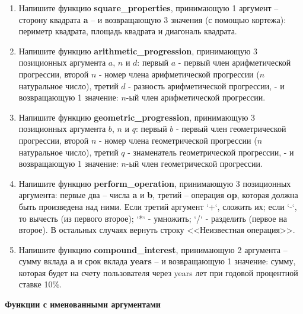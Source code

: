 \documentclass[a4,12pt]{article}
\theoremstyle{remark}
\begin{document}
\begin{enumerate}
    \item Напишите функцию \textbf{square\_properties}, принимающую 1 аргумент – сторону квадрата \textbf{a} – и возвращающую 3 значения (с помощью кортежа): периметр квадрата, площадь квадрата и диагональ квадрата.
    \item Напишите функцию \textbf{arithmetic\_progression}, принимающую 3 позиционных аргумента $a$, $n$ и $d$: первый $a$ - первый член арифметической прогрессии, второй $n$ - номер члена арифметической прогрессии ($n$ натуральное число), третий $d$ - разность арифметической прогрессии, - и возвращающую 1 значение: $n$-ый член арифметической прогрессии.
    \item Напишите функцию \textbf{geometric\_progression}, принимающую 3 позиционных аргумента $b$, $n$ и $q$: первый $b$ - первый член геометрической прогрессии, второй $n$ - номер члена геометрической прогрессии ($n$ натуральное число), третий $q$ - знаменатель геометрической прогрессии, - и возвращающую 1 значение: $n$-ый член геометрической прогрессии.
    \item Напишите функцию \textbf{perform\_operation}, принимающую 3 позиционных аргумента: первые два – числа \textbf{a} и \textbf{b}, третий – операция \textbf{op}, которая должна быть произведена над ними. Если третий аргумент `+`, сложить их; если `-`, то вычесть (из первого второе); `*` - умножить; `/` - разделить (первое на второе). В остальных случаях вернуть строку <<Неизвестная операция>>.
    \item Напишите функцию \textbf{compound\_interest}, принимающую 2 аргумента – сумму вклада \textbf{a} и срок вклада \textbf{years} – и возвращающую 1 значение: сумму, которая будет на счету пользователя через years лет при годовой процентной ставке 10\%.
\end{enumerate}


\textbf{Функции с именованными аргументами}
\end{document}

